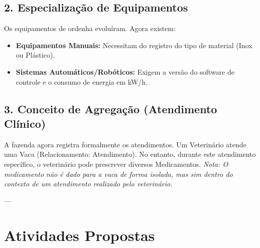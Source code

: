\documentclass[12pt]{article}
\begin{document}
\subsection*{2. Especialização de Equipamentos}
Os equipamentos de ordenha evoluíram. Agora existem:
\begin{itemize}
    \item \textbf{Equipamentos Manuais:} Necessitam do registro do tipo de material (Inox ou Plástico).
    \item \textbf{Sistemas Automáticos/Robóticos:} Exigem a versão do software de controle e o consumo de energia em kW/h.
\end{itemize}

\subsection*{3. Conceito de Agregação (Atendimento Clínico)}
A fazenda agora registra formalmente os atendimentos. Um Veterinário atende uma Vaca (Relacionamento: Atendimento). No entanto, durante este atendimento específico, o veterinário pode prescrever diversos Medicamentos. 
\textit{Nota: O medicamento não é dado para a vaca de forma isolada, mas sim dentro do contexto de um atendimento realizado pelo veterinário.}

---

\section*{Atividades Propostas}
\end{document}
